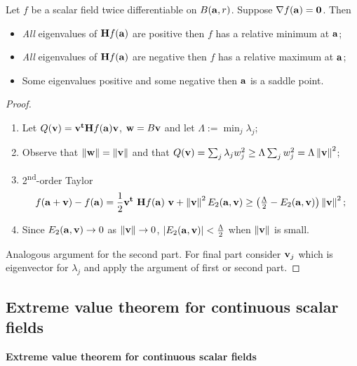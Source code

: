 \begin{theorem}
    Let \(f\) be a scalar field twice differentiable on \(B(\aa,r)\).
    Suppose  \(\nabla f(\aa) = \mathbf{0}\).
    Then
    \begin{itemize}
        \item \emph{All} eigenvalues of \(\mathbf{H} f (\aa)\) are positive then \(f\) has a relative minimum at \(\aa\);
        \item \emph{All} eigenvalues of \(\mathbf{H} f (\aa)\) are negative then \(f\) has a relative maximum at \(\aa\);
        \item Some eigenvalues positive and some negative then \(\aa\) is a saddle point.
    \end{itemize}
\end{theorem}

\begin{proof}
    \begin{enumerate}
        \item Let \(Q(\vv) =  \vv^{\mathbf{t}} \mathbf{H} f (\aa) \vv  \),  \(\ww = B \vv\) and let \(\Lambda := \min_j \lambda_j\);
        \item Observe that \(\norm{\ww} =  \norm{\vv}\) and that \(Q(\vv)=  \sum_{j} \lambda_j w_j^2  \geq \Lambda \sum_{j} w_j^2 = \Lambda  \norm{\vv}^2 \);
        \item 2\textsuperscript{nd}-order Taylor
              \vspace{-1em}
              \[
                  f(\aa+\vv) - f(\aa)
                  =  \frac{1}{2} \vv^{\mathbf{t}} \ \mathbf{H} f (\aa) \ \vv + \norm{\vv}^2 E_2(\aa,\vv)
                  \geq  \left(\tfrac{\Lambda}{2} - E_2(\aa,\vv) \right) \norm{\vv}^2;
              \]
        \item Since \(E_2(\aa,\vv) \to 0\) as \(\norm{\vv}\to 0\), \(\abs{E_2(\aa,\vv)} < \tfrac{\Lambda}{2}\) when \(\norm{\vv}\) is small.
    \end{enumerate}
    Analogous argument for the second part. For final part consider \(\vv_j\) which is eigenvector for \(\lambda_j\) and apply the argument of first or second part.
\end{proof}



\subsection{Extreme value theorem for continuous scalar fields}


\textbf{Extreme value theorem for continuous scalar fields}

